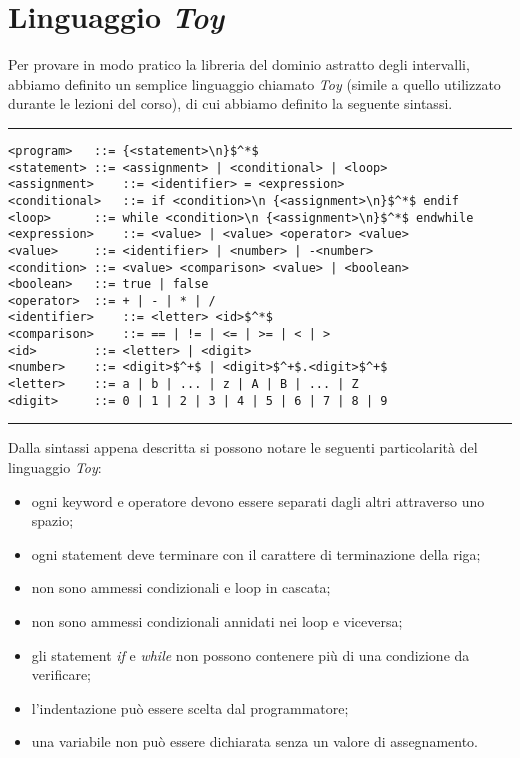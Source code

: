 \documentclass[a4paper, 10pt]{report}
\begin{document}
\section*{Linguaggio \textit{Toy}}
Per provare in modo pratico la libreria del dominio astratto degli intervalli, abbiamo definito un semplice linguaggio chiamato \textit{Toy} (simile a quello utilizzato durante le lezioni del corso), di cui abbiamo definito la seguente sintassi.
\newline

\hrule
\begin{lstlisting}[basicstyle=\footnotesize\ttfamily]
<program>	::= {<statement>\n}$^*$
<statement>	::= <assignment> | <conditional> | <loop>
<assignment>	::= <identifier> = <expression>
<conditional>	::= if <condition>\n {<assignment>\n}$^*$ endif
<loop>		::= while <condition>\n {<assignment>\n}$^*$ endwhile 
<expression>	::= <value> | <value> <operator> <value>
<value>		::= <identifier> | <number> | -<number>
<condition>	::= <value> <comparison> <value> | <boolean>
<boolean>	::= true | false
<operator>	::= + | - | * | / 
<identifier>	::= <letter> <id>$^*$
<comparison>	::= == | != | <= | >= | < | >
<id>		::= <letter> | <digit>
<number>	::= <digit>$^+$ | <digit>$^+$.<digit>$^+$
<letter>	::= a | b | ... | z | A | B | ... | Z
<digit>		::= 0 | 1 | 2 | 3 | 4 | 5 | 6 | 7 | 8 | 9
\end{lstlisting}

\hrule
\newpage
\noindent
Dalla sintassi appena descritta si possono notare le seguenti particolarità del linguaggio \textit{Toy}:
\begin{itemize}
	\item ogni keyword e operatore devono essere separati dagli altri attraverso uno spazio;
	\item ogni statement deve terminare con il carattere di terminazione della riga;
	\item non sono ammessi condizionali e loop in cascata;
	\item non sono ammessi condizionali annidati nei loop e viceversa;
	\item gli statement \textit{if} e \textit{while} non possono contenere più di una condizione da verificare;
	\item l'indentazione può essere scelta dal programmatore;
	\item una variabile non può essere dichiarata senza un valore di assegnamento.
\end{itemize}
\end{document}

